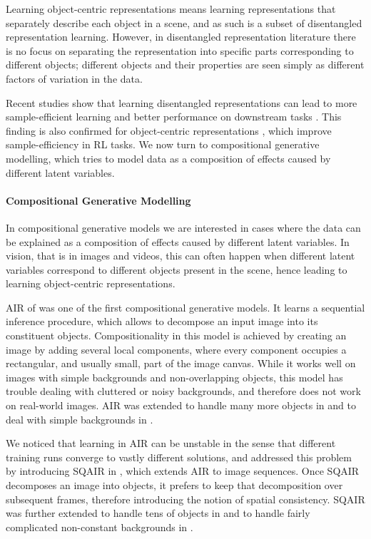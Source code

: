 	
	Learning object-centric representations means learning representations that separately describe each object in a scene, and as such is a subset of disentangled representation learning.
	However, in disentangled representation literature there is no focus on separating the representation into specific parts corresponding to different objects; different objects and their properties are seen simply as different factors of variation in the data. 
	
	Recent studies show that learning disentangled representations can lead to more sample-efficient learning and better performance on downstream tasks \citep{Steenkiste2019disentangled}.
	This finding is also confirmed for object-centric representations \citep{Veerapaneni2019op3}, which improve sample-efficiency in \gls{RL} tasks.
	We now turn to compositional generative modelling, which tries to model data as a composition of effects caused by different latent variables.
	
	\paragraph{Compositional Generative Modelling}
	In compositional generative models we are interested in cases where the data can be explained as a composition of effects caused by different latent variables.
	In vision, that is in images and videos, this can often happen when different latent variables correspond to different objects present in the scene, hence leading to learning object-centric representations.
	
	\Gls{AIR} of \cite{Eslami2016air} was one of the first compositional generative models.
	It learns a sequential inference procedure, which allows to decompose an input image into its constituent objects.
	Compositionality in this model is achieved by creating an image by adding several local components, where every component occupies a rectangular, and usually small, part of the image canvas.
	While it works well on images with simple backgrounds and non-overlapping objects, this model has trouble dealing with cluttered or noisy backgrounds, and therefore does not work on real-world images. \Gls{AIR} was extended to handle many more objects in \cite{Crawford2019spair} and to deal with simple backgrounds in \cite{Stelzner2019supair}.
	
	We noticed that learning in \gls{AIR} can be unstable in the sense that different training runs converge to vastly different solutions, and addressed this problem by introducing \gls{SQAIR} in , which extends \gls{AIR} to image sequences.
	Once \gls{SQAIR} decomposes an image into objects, it prefers to keep that decomposition over subsequent frames, therefore introducing the notion of spatial consistency.
	\Gls{SQAIR} was further extended to handle tens of objects in \cite{Crawford2020silot,Jiang2019scalor} and to handle fairly complicated non-constant backgrounds in \cite{Jiang2019scalor}.
	
